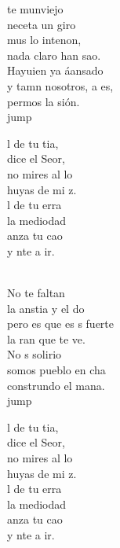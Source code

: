 \begin{cancion}%
	te munviejo\\
	neceta un giro \\
	mus lo intenon,\\
	nada claro han sao.\\
	Hayuien ya áansado\\
	y tamn nosotros, a es, \\
	permos la sión.\\jump\\
	\begin{chorus}%
	l de tu tia,\\
	 dice el Seor,\\
	no mires al lo\\
	 huyas de mi z.\\
	l de tu erra\\
	la mediodad\\
	anza tu cao\\
	y nte a ir.\\
	\end{chorus}%
	\jump\\
	No te faltan\\
	la anstia y el do\\
	pero es que es s fuerte\\
	la ran que te ve.\\
	No s solirio\\
	somos pueblo en cha\\
	construndo el mana.\\jump\\
	\begin{chorus}%
	l de tu tia,\\
	 dice el Seor,\\
	no mires al lo\\
	 huyas de mi z.\\
	l de tu erra\\
	la mediodad\\
	anza tu cao\\
	y nte a ir.\\
	\end{chorus}%
	\jump\\
\end{cancion}%
